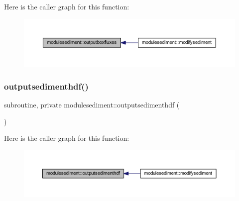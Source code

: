 Here is the caller graph for this function\+:\nopagebreak
\begin{figure}[H]
\begin{center}
\leavevmode
\includegraphics[width=350pt]{namespacemodulesediment_abf7a07c3cdbe931d82c21146e433eaeb_icgraph}
\end{center}
\end{figure}
\mbox{\label{namespacemodulesediment_abfa4d5937f78f3781b6b3108b8068185}} 
\subsubsection{\texorpdfstring{outputsedimenthdf()}{outputsedimenthdf()}}
{\footnotesize\ttfamily subroutine, private modulesediment\+::outputsedimenthdf (\begin{DoxyParamCaption}{ }\end{DoxyParamCaption})\hspace{0.3cm}{\ttfamily [private]}}

Here is the caller graph for this function\+:\nopagebreak
\begin{figure}[H]
\begin{center}
\leavevmode
\includegraphics[width=350pt]{namespacemodulesediment_abfa4d5937f78f3781b6b3108b8068185_icgraph}
\end{center}
\end{figure}
\mbox{\label{namespacemodulesediment_ae14a9f4cd6513444502e3774b27d6f2e}} 
